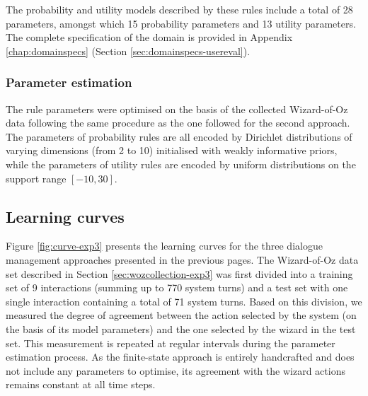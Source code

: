 \begin{itemize}
\end{itemize}

The probability and utility models described by these rules include a total of 28 parameters, amongst which 15 probability parameters and 13 utility parameters.  The complete specification of the domain is provided in Appendix \ref{chap:domainspecs} (Section \ref{sec:domainspecs-usereval}). 

\subsubsection*{Parameter estimation}

The rule parameters were optimised on the basis of the collected Wizard-of-Oz data following the same procedure as the one followed for the second approach.  The parameters of probability rules are all encoded by Dirichlet distributions of varying dimensions (from 2 to 10) initialised with weakly informative priors, while the parameters of utility rules are encoded by uniform distributions on the support range $[-10, 30]$.  


\subsection{Learning curves}
\label{sec:learningcurve-exp3}

Figure \ref{fig:curve-exp3} presents the learning curves for the three dialogue management approaches presented in the previous pages. The Wizard-of-Oz data set described in Section \ref{sec:wozcollection-exp3} was first divided into a training set of 9 interactions (summing up to 770 system turns) and a test set with one single interaction containing a total of 71 system turns. Based on this division, we measured the degree of agreement between the action selected by the system (on the basis of its model parameters) and the one selected by the wizard in the test set. This measurement is repeated at regular intervals during the parameter estimation process.  As the finite-state approach is entirely handcrafted and does not include any parameters to optimise, its agreement with the wizard actions remains constant at all time steps. 

